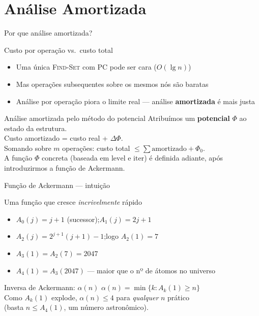 \documentclass[aspectratio=169]{beamer}
\begin{document}
\section{Análise Amortizada}

\begin{frame}{Por que análise amortizada?}%
  \begin{block}{Custo por operação vs.\ custo total}
    \begin{itemize}
      \item Uma única \textsc{Find-Set} com PC pode ser cara ($O(\lg n)$)
      \item Mas operações subsequentes sobre os mesmos nós são baratas
      \item Análise por operação piora o limite real — análise \textbf{amortizada} é mais justa
    \end{itemize}
  \end{block}
  \vspace{0.3cm}
  \begin{exampleblock}{Análise amortizada pelo método do potencial}
    Atribuímos um \textbf{potencial} $\Phi$ ao estado da estrutura.\\
    Custo amortizado = custo real + $\Delta\Phi$.\\
    Somando sobre $m$ operações: custo total $\leq \sum \text{amortizado} + \Phi_0$.\\[4pt]
    \footnotesize A função $\Phi$ concreta (baseada em $\mathrm{level}$ e $\mathrm{iter}$) é definida adiante,
    após introduzirmos a função de Ackermann.
  \end{exampleblock}
\end{frame}

\begin{frame}{Função de Ackermann — intuição}%
  \begin{block}{Uma função que cresce \emph{incrivelmente} rápido}
    \begin{itemize}
      \item $A_0(j) = j+1$ (sucessor);\quad $A_1(j) = 2j+1$
      \item $A_2(j) = 2^{j+1}(j+1)-1$;\quad logo $A_2(1) = 7$
      \item $A_3(1) = A_2(7) = 2047$
      \item $A_4(1) = A_3(2047)$ — maior que o nº de átomos no universo
    \end{itemize}
  \end{block}
  \vspace{0.3cm}
  \begin{alertblock}{Inversa de Ackermann: $\alpha(n)$}
    $\alpha(n) = \min\{k : A_k(1) \geq n\}$\\[4pt]
    Como $A_k(1)$ explode, $\alpha(n) \leq 4$ para \emph{qualquer} $n$ prático\\
    (basta $n \leq A_4(1)$, um número astronômico).
  \end{alertblock}
\end{frame}
\end{document}
